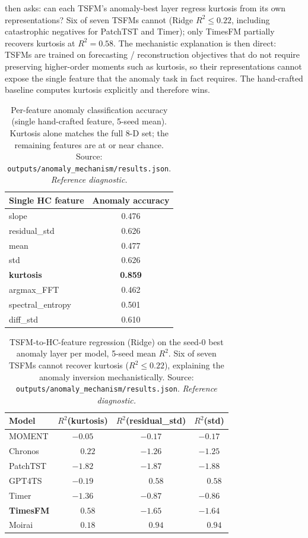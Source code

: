 \documentclass{article}
\begin{document}
 then asks: can each TSFM's anomaly-best layer regress kurtosis from its own representations? Six of seven TSFMs cannot (Ridge $R^2 \leq 0.22$, including catastrophic negatives for PatchTST and Timer); only TimesFM partially recovers kurtosis at $R^2 = 0.58$. The mechanistic explanation is then direct: TSFMs are trained on forecasting / reconstruction objectives that do not require preserving higher-order moments such as kurtosis, so their representations cannot expose the single feature that the anomaly task in fact requires. The hand-crafted baseline computes kurtosis explicitly and therefore wins.

\begin{table}[htbp]
\caption{Per-feature anomaly classification accuracy (single hand-crafted feature, 5-seed mean). Kurtosis alone matches the full 8-D set; the remaining features are at or near chance. Source: \texttt{outputs/anomaly\_mechanism/results.json}. \emph{Reference diagnostic.}}
\label{tab:anomaly_per_feature}
\centering
\small
\begin{tabular}{lc}
\toprule
Single HC feature & Anomaly accuracy \\
\midrule
slope             & 0.476 \\
residual\_std     & 0.626 \\
mean              & 0.477 \\
std               & 0.626 \\
\textbf{kurtosis} & \textbf{0.859} \\
argmax\_FFT       & 0.462 \\
spectral\_entropy & 0.501 \\
diff\_std         & 0.610 \\
\bottomrule
\end{tabular}
\end{table}

\begin{table}[htbp]
\caption{TSFM-to-HC-feature regression (Ridge) on the seed-0 best anomaly layer per model, 5-seed mean $R^2$. Six of seven TSFMs cannot recover kurtosis ($R^2 \leq 0.22$), explaining the anomaly inversion mechanistically. Source: \texttt{outputs/anomaly\_mechanism/results.json}. \emph{Reference diagnostic.}}
\label{tab:tsfm_to_kurtosis}
\centering
\small
\begin{tabular}{lccc}
\toprule
Model & $R^2$(kurtosis) & $R^2$(residual\_std) & $R^2$(std) \\
\midrule
MOMENT   & $-0.05$  & $-0.17$ & $-0.17$ \\
Chronos  & $\phantom{-}0.22$ & $-1.26$ & $-1.25$ \\
PatchTST & $-1.82$  & $-1.87$ & $-1.88$ \\
GPT4TS   & $-0.19$  & $\phantom{-}0.58$ & $\phantom{-}0.58$ \\
Timer    & $-1.36$  & $-0.87$ & $-0.86$ \\
\textbf{TimesFM}  & $\phantom{-}\mathbf{0.58}$  & $-1.65$ & $-1.64$ \\
Moirai   & $\phantom{-}0.18$ & $\phantom{-}0.94$ & $\phantom{-}0.94$ \\
\bottomrule
\end{tabular}
\end{table}
\end{document}

